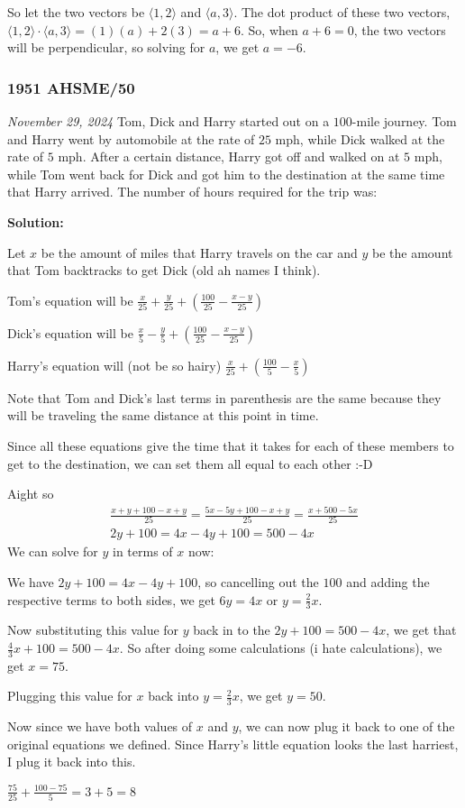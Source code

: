 \documentclass[../mathproblems.tex]{subfiles}
\begin{document}
So let the two vectors be $\langle 1,2 \rangle$ and $\langle a,3\rangle$. The dot product of these two vectors, $\langle 1,2\rangle \cdot \langle a,3\rangle = (1)(a) + 2(3) = a+6$. So, when $a+6=0$, the two vectors will be perpendicular, so solving for $a$, we get $a=\boxed{-6}$.

\noindent\hrulefill



\subsubsection*{1951 AHSME/50} 
\textit{November 29, 2024}
Tom, Dick and Harry started out on a $100$-mile journey. Tom and Harry went by automobile at the rate of $25$ mph, while Dick walked at the rate of $5$ mph. After a certain distance, Harry got off and walked on at $5$ mph, while Tom went back for Dick and got him to the destination at the same time that Harry arrived. The number of hours required for the trip was:

\textbf{Solution:}

Let $x$ be the amount of miles that Harry travels on the car and $y$ be the amount that Tom backtracks to get Dick (old ah names I think).

Tom's equation will be $\frac{x}{25}+\frac{y}{25} + \left(\frac{100}{25}-\frac{x-y}{25}\right)$

Dick's equation will be $\frac{x}{5}-\frac{y}{5} + \left(\frac{100}{25}-\frac{x-y}{25}\right)$

Harry's equation will (not be so hairy) $\frac{x}{25}+\left(\frac{100}{5}-\frac{x}{5}\right)$

Note that Tom and Dick's last terms in parenthesis are the same because they will be traveling the same distance at this point in time.

Since all these equations give the time that it takes for each of these members to get to the destination, we can set them all equal to each other :-D

Aight so
\begin{align*} \frac{x+y+100-x+y}{25}=\frac{5x-5y+100-x+y}{25}=\frac{x+500-5x}{25}\\ 2y+100=4x-4y+100=500-4x \end{align*}We can solve for $y$ in terms of $x$ now:

We have $2y+100=4x-4y+100$, so cancelling out the $100$ and adding the respective terms to both sides, we get $6y=4x$ or $y=\frac{2}{3}x$.

Now substituting this value for $y$ back in to the $2y+100=500-4x$, we get that $\frac{4}{3}x+100=500-4x$. So after doing some calculations (i hate calculations), we get $x=75$.

Plugging this value for $x$ back into $y=\frac{2}{3}x$, we get $y=50$.

Now since we have both values of $x$ and $y$, we can now plug it back to one of the original equations we defined. Since Harry's little equation looks the last harriest, I plug it back into this.

$\frac{75}{25}+\frac{100-75}{5}=3+5 = \boxed{8}$

\noindent\hrulefill
\end{document}
